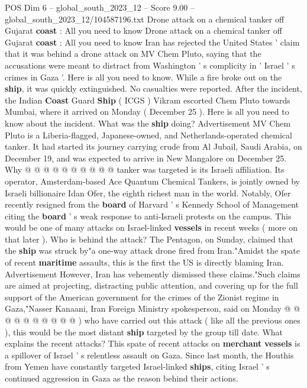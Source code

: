 \begin{textsample}{POS Dim 6 – global\_south\_2023\_12 – Score 9.00 – global\_south\_2023\_12/104587196.txt}  \label{ex:f6_pos_124}
Drone attack on a chemical tanker off Gujarat \textbf{coast} : All you need to know Drone attack on a chemical tanker off Gujarat \textbf{coast} : All you need to know Iran has rejected the United States ' claim that it was behind a drone attack on MV Chem Pluto, saying that the accusations were meant to distract from Washington ' s complicity in ' Israel ' s crimes in Gaza '.
Here is all you need to know.
While a fire broke out on the \textbf{ship}, it was quickly extinguished.
No casualties were reported.
After the incident, the Indian \textbf{Coast} Guard \textbf{Ship} ( ICGS ) Vikram escorted Chem Pluto towards Mumbai, where it arrived on Monday ( December 25 ).
Here is all you need to know about the incident.
What was the \textbf{ship} doing?
Advertisement MV Chem Pluto is a Liberia-flagged, Japanese-owned, and Netherlands-operated chemical tanker.
It had started its journey carrying crude from Al Jubail, Saudi Arabia, on December 19, and was expected to arrive in New Mangalore on December 25.
Why @ @ @ @ @ @ @ @ @ @ tanker was targeted is its Israeli affiliation.
Its operator, Amsterdam-based Ace Quantum Chemical Tankers, is jointly owned by Israeli billionaire Idan Ofer, the eighth richest man in the world.
Notably, Ofer recently resigned from the \textbf{board} of Harvard ' s Kennedy School of Management citing the \textbf{board} ' s weak response to anti-Israeli protests on the campus.
This would be one of many attacks on Israel-linked \textbf{vessels} in recent weeks ( more on that later ).
Who is behind the attack?
The Pentagon, on Sunday, claimed that the \textbf{ship} was struck by"a one-way attack drone fired from Iran."Amidst the spate of recent \textbf{maritime} assaults, this is the first the US is directly blaming Iran.
Advertisement However, Iran has vehemently dismissed these claims."Such claims are aimed at projecting, distracting public attention, and covering up for the full support of the American government for the crimes of the Zionist regime in Gaza,"Nasser Kanaani, Iran Foreign Ministry spokesperson, said on Monday @ @ @ @ @ @ @ @ @ @ ) who have carried out this attack ( like all the previous ones ), this would be the most distant \textbf{ship} targeted by the group till date.
What explains the recent attacks?
This spate of recent attacks on \textbf{merchant} \textbf{vessels} is a spillover of Israel ' s relentless assault on Gaza.
Since last month, the Houthis from Yemen have constantly targeted Israel-linked \textbf{ships}, citing Israel ' s continued aggression in Gaza as the reason behind their actions.

\end{textsample}
